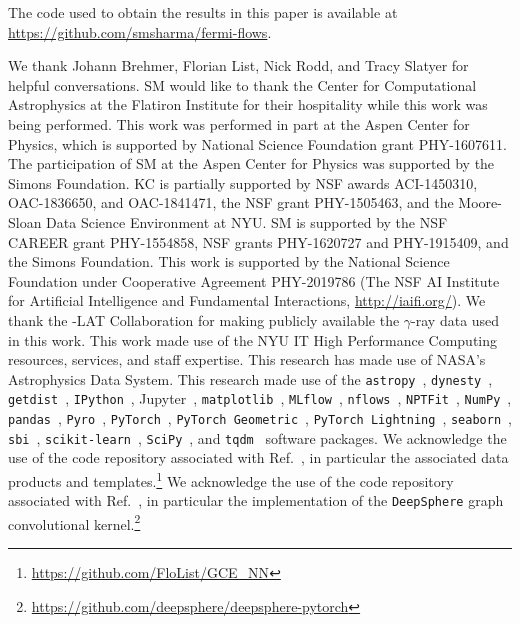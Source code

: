 \documentclass[prd,aps,10pt,nofootinbib,twocolumn,superscriptaddress,preprintnumbers,balancelastpage,longbibliography]{revtex4-1}
\begin{document}
The code used to obtain the results in this paper is available at \url{https://github.com/smsharma/fermi-flows}.


\vspace{.2cm}

\begin{acknowledgments}

We thank Johann Brehmer, Florian List, Nick Rodd, and Tracy Slatyer for helpful conversations. 
SM would like to thank the Center for Computational Astrophysics at the Flatiron Institute for their hospitality while this work was being performed. 
This work was performed in part at the Aspen Center for Physics, which is supported by National Science Foundation grant PHY-1607611.
The participation of SM at the Aspen Center for Physics was supported by the Simons Foundation.
KC is partially supported by NSF awards ACI-1450310, OAC-1836650, and OAC-1841471, the NSF grant PHY-1505463, and the Moore-Sloan Data Science Environment at NYU. 
SM is supported by the NSF CAREER grant PHY-1554858, NSF grants PHY-1620727 and PHY-1915409, and the Simons Foundation. 
This work is supported by the National Science Foundation under Cooperative Agreement PHY-2019786 (The NSF AI Institute for Artificial Intelligence and Fundamental Interactions, \url{http://iaifi.org/}).
We thank the \Fermi-LAT Collaboration for making publicly available the $\gamma$-ray data used in this work.
This work made use of the NYU IT High Performance Computing resources, services, and staff expertise. 
This research has made use of NASA's Astrophysics Data System. 
This research made use of the \texttt{astropy}~\cite{Price-Whelan:2018hus,Robitaille:2013mpa}, \texttt{dynesty}~\cite{Speagle_2020}, \texttt{getdist}~\cite{Lewis:2019xzd}, \texttt{IPython}~\cite{PER-GRA:2007}, Jupyter~\cite{Kluyver2016JupyterN}, \texttt{matplotlib}~\cite{Hunter:2007}, \texttt{MLflow}~\cite{chen2020developments}, \texttt{nflows}~\cite{nflows}, \texttt{NPTFit}~\cite{Mishra-Sharma:2016gis}, \texttt{NumPy}~\cite{harris2020array}, \texttt{pandas}~\cite{pandas:2010}, \texttt{Pyro}~\cite{bingham2018pyro}, \texttt{PyTorch}~\cite{NEURIPS2019_9015}, \texttt{PyTorch Geometric}~\cite{Fey/Lenssen/2019}, \texttt{PyTorch Lightning}~\cite{william_falcon_2020_3828935}, \texttt{seaborn}~\cite{seaborn}, \texttt{sbi}~\cite{tejero-cantero2020sbi}, \texttt{scikit-learn}~\cite{scikit-learn}, \texttt{SciPy}~\cite{2020SciPy-NMeth}, and \texttt{tqdm}~\cite{da2019tqdm} software packages. We acknowledge the use of the code repository associated with Ref.~\cite{List:2020mzd}, in particular the associated data products and templates.\footnote{\url{https://github.com/FloList/GCE_NN}} We acknowledge the use of the code repository associated with Ref.~\cite{defferrard2020deepsphere}, in particular the implementation of the \texttt{DeepSphere} graph convolutional kernel.\footnote{\url{https://github.com/deepsphere/deepsphere-pytorch}}
\end{acknowledgments}





\end{document}
